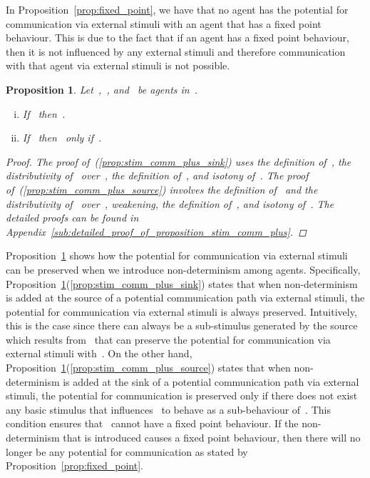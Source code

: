 \documentclass[copyright,creativecommons]{eptcs}
\makeatletter
\newcommand{\PFC}{potential for communication\@\xspace}
\newtheorem{proposition}{Proposition}
\makeatother
\begin{document}
In Proposition~\ref{prop:fixed_point}, we have that no agent has the \PFC via external stimuli with an agent that has a fixed point behaviour. This is due to the fact that if an agent has a fixed point behaviour, then it is not influenced by any external stimuli and therefore communication with that agent via external stimuli is not possible.

\begin{proposition}
\label{prop:stim_comm_plus}	
	Let~,~, and~ be agents in~.
	\begin{enumerate}[(i)]
		\item \label{prop:stim_comm_plus_sink}
			If~ then~.
		\item \label{prop:stim_comm_plus_source}
			If~ then~ only if~.
	\end{enumerate}

	\begin{proof}
		 The proof of~(\ref{prop:stim_comm_plus_sink}) uses the definition of~, the distributivity of~ over~, the definition of~, and isotony of~. The proof of~(\ref{prop:stim_comm_plus_source}) involves the definition of~ and the distributivity of~ over~, weakening, the definition of~, and isotony of~. The detailed proofs can be found in Appendix~\ref{sub:detailed_proof_of_proposition_stim_comm_plus}. 
	\end{proof}
\end{proposition}

Proposition~\ref{prop:stim_comm_plus} shows how the \PFC via external stimuli can be preserved when we introduce non-determinism among agents. Specifically, Proposition~\ref{prop:stim_comm_plus}(\ref{prop:stim_comm_plus_sink}) states that when non-determinism is added at the source of a potential communication path via external stimuli, the \PFC via external stimuli is always preserved. Intuitively, this is the case since there can always be a sub-stimulus generated by the source which results from~ that can preserve the \PFC via external stimuli with~. On the other hand, Proposition~\ref{prop:stim_comm_plus}(\ref{prop:stim_comm_plus_source}) states that when non-determinism is added at the sink of a potential communication path via external stimuli, the \PFC is preserved only if there does not exist any basic stimulus that influences~ to behave as a sub-behaviour of~. This condition ensures that~ cannot have a fixed point behaviour. If the non-determinism that is introduced causes a fixed point behaviour, then there will no longer be any \PFC as stated by Proposition~\ref{prop:fixed_point}.
\end{document}
